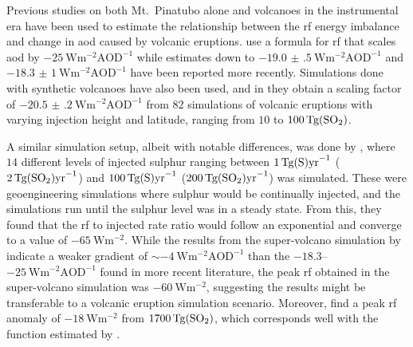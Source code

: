 \documentclass{ametsocV6.1}
\begin{document}
Previous studies on both Mt.\ Pinatubo alone \citep{mills2017,hansen2005} and volcanoes
in the instrumental era \citep{gregory2016} have been used to estimate the relationship
between the \gls{rf} energy imbalance and change in \gls{aod} caused by volcanic
eruptions. \citet{myhre2013} use a formula for \gls{rf} that scales \gls{aod} by
\(\SI{-25}{\watt\metre^{-2}\mathrm{AOD}^{-1}}\) while estimates down to
\(\SI{-19.0(5)}{\watt\metre^{-2}\mathrm{AOD}^{-1}}\) \citep{gregory2016} and
\(\SI{-18.3(10)}{\watt\metre^{-2}\mathrm{AOD}^{-1}}\) \citep{mills2017} have been
reported more recently. Simulations done with synthetic volcanoes have also been used,
and in \citet{marshall2020} they obtain a scaling factor of
\(\SI{-20.5(2)}{\watt\metre^{-2}\mathrm{AOD}^{-1}}\) from \(82\) simulations of volcanic
eruptions with varying injection height and latitude, ranging from \(10\) to
\(\SI{100}{\tera\gram(\ce{SO2})}\).

A similar simulation setup, albeit with notable differences, was done by
\citet{niemeier2015}, where \(14\) different levels of injected sulphur ranging between
\(\SI{1}{\tera\gram(\ce{S})\mathrm{yr}^{-1}}\)
(\(\SI{2}{\tera\gram(\ce{SO2})\mathrm{yr}^{-1}}\)) and
\(\SI{100}{\tera\gram(\ce{S})\mathrm{yr}^{-1}}\)
(\(\SI{200}{\tera\gram(\ce{SO2})\mathrm{yr}^{-1}}\)) was simulated. These were
geoengineering simulations where sulphur would be continually injected, and the
simulations run until the sulphur level was in a steady state. From this, they found
that the \gls{rf} to injected  rate ratio would follow an exponential and
converge to a value of \(\SI{-65}{\watt\metre^{-2}}\). While the results from the
super-volcano simulation by \citet{jones2005} indicate a weaker gradient of \(\sim
\SI{-4}{\watt\metre^{-2}\mathrm{AOD}^{-1}}\) than the
\(-18.3\)--\(\SI{-25}{\watt\metre^{-2}\mathrm{AOD}^{-1}}\) found in more recent
literature, the peak \gls{rf} obtained in the super-volcano simulation was
\(\SI{-60}{\watt\metre^{-2}}\), suggesting the \citet{niemeier2015} results might be
transferable to a volcanic eruption simulation scenario. Moreover, \citet{timmreck2010}
find a peak \gls{rf} anomaly of \(\SI{-18}{\watt\metre^{-2}}\) from
\(\SI{1700}{\tera\gram(\ce{SO2})}\), which corresponds well with the function estimated
by \citet{niemeier2015}.
\end{document}
